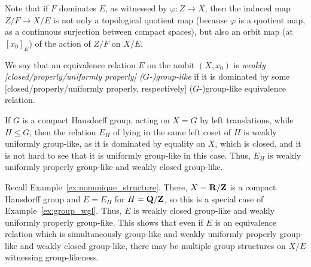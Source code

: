 	\begin{rem}
		\label{rem:domin_orbit}
		Note that if $F$ dominates $E$, as witnessed by $\varphi\colon Z\to X$, then the induced map $Z/F\to X/E$ is not only a topological quotient map (because $\varphi$ is a quotient map, as a continuous surjection between compact spaces), but also an orbit map (at $[x_0]_E$) of the action of $Z/F$ on $X/E$.
		\xqed{\lozenge}
	\end{rem}
	
	\begin{dfn}
		\label{dfn:wkglike}
		We say that an equivalence relation $E$ on the ambit $(X,x_0)$ is \emph{weakly [closed/properly/uniformly properly] ($G$-)group-like} if it is dominated by some [closed/properly/uniformly properly, respectively] ($G$-)group-like equivalence relation.\xqed{\lozenge}
	\end{dfn}
	
	
	\begin{ex}
		\label{ex:group_wgl}
		If $G$ is a compact Hausdorff group, acting on $X=G$ by left translations, while $H\leq G$, then the relation $E_H$ of lying in the same left coset of $H$ is weakly uniformly group-like, as it is dominated by equality on $X$, which is closed, and it is not hard to see that it is uniformly group-like in this case. Thus, $E_H$ is weakly uniformly properly group-like and weakly closed group-like.\xqed{\lozenge}
	\end{ex}
	
	\begin{ex}
		\label{ex:noteventhen}
		Recall Example~\ref{ex:nonunique_structure}. There, $X={\mathbf{R}}/{\mathbf{Z}}$ is a compact Hausdorff group and $E=E_H$ for $H={\mathbf{Q}}/{\mathbf{Z}}$, so this is a special case of Example~\ref{ex:group_wgl}. Thus, $E$ is weakly closed group-like and weakly uniformly properly group-like. This shows that even if $E$ is an equivalence relation which is simultaneously group-like and weakly uniformly properly group-like and weakly closed group-like, there may be multiple group structures on $X/E$ witnessing group-likeness.\xqed{\lozenge}
	\end{ex}
	
